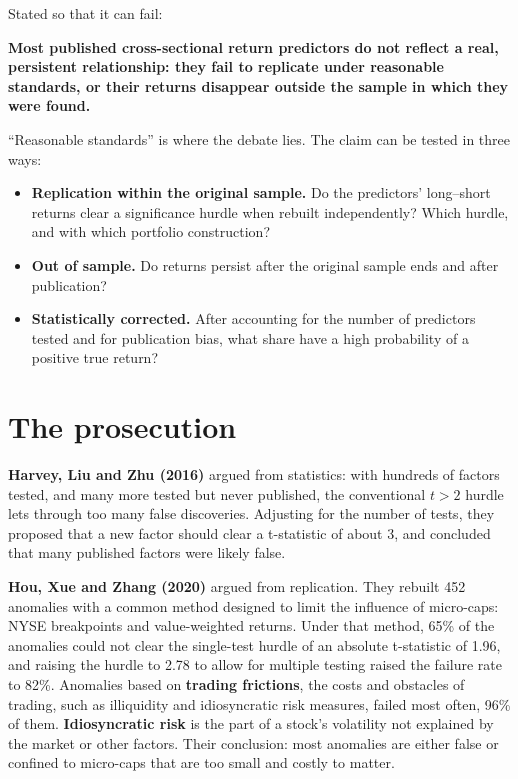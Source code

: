 Stated so that it can fail:

\begin{callout}
\textbf{Most published cross-sectional return predictors do not reflect a real, persistent relationship: they fail to replicate under reasonable standards, or their returns disappear outside the sample in which they were found.}
\end{callout}

``Reasonable standards'' is where the debate lies. The claim can be tested in three ways:

\begin{itemize}
  \item \textbf{Replication within the original sample.} Do the predictors' long--short returns clear a significance hurdle when rebuilt independently? Which hurdle, and with which portfolio construction?
  \item \textbf{Out of sample.} Do returns persist after the original sample ends and after publication?
  \item \textbf{Statistically corrected.} After accounting for the number of predictors tested and for publication bias, what share have a high probability of a positive true return?
\end{itemize}

\section{The prosecution}
\label{sec:10-prosecution}

\textbf{Harvey, Liu and Zhu (2016)} argued from statistics: with hundreds of factors tested, and many more tested but never published, the conventional $t > 2$ hurdle lets through too many false discoveries. Adjusting for the number of tests, they proposed that a new factor should clear a t-statistic of about 3, and concluded that many published factors were likely false.

\textbf{Hou, Xue and Zhang (2020)} argued from replication. They rebuilt 452 anomalies with a common method designed to limit the influence of micro-caps: NYSE breakpoints and value-weighted returns. Under that method, 65\% of the anomalies could not clear the single-test hurdle of an absolute t-statistic of 1.96, and raising the hurdle to 2.78 to allow for multiple testing raised the failure rate to 82\%. Anomalies based on \textbf{trading frictions}, the costs and obstacles of trading, such as illiquidity and idiosyncratic risk measures, failed most often, 96\% of them. \textbf{Idiosyncratic risk} is the part of a stock's volatility not explained by the market or other factors. Their conclusion: most anomalies are either false or confined to micro-caps that are too small and costly to matter.

